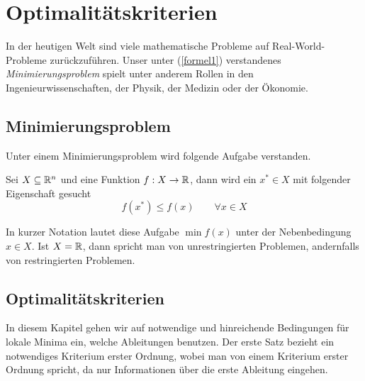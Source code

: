 \chapter{Optimalitätskriterien}


In der heutigen Welt sind viele mathematische Probleme auf Real-World-Probleme zurückzuführen. Unser unter (\ref{formel1}) verstandenes \textit{Minimierungsproblem} spielt unter anderem Rollen in den Ingenieurwissenschaften, der Physik, der Medizin oder der Ökonomie. 

\section{Minimierungsproblem}
Unter einem Minimierungsproblem wird folgende Aufgabe verstanden.  

\begin{definition}
	Sei $ X \subseteq \mathbb{R}^n $ und eine Funktion $ f: X \to \mathbb{R} $, dann wird ein $x^\ast \in X $ mit folgender Eigenschaft gesucht
	\begin{equation} 
		f(x^\ast) \leq f(x)   \qquad \forall x \in X 
		\label{formel1}
	\end{equation}
\end{definition}

\begin{bemerkung}
	In kurzer Notation lautet diese Aufgabe $ \min f(x)$ unter der Nebenbedingung $x \in X$. Ist $X = \mathbb{R}$, dann spricht man von unrestringierten Problemen, andernfalls von restringierten Problemen. 
\end{bemerkung}

\section{Optimalitätskriterien}

In diesem Kapitel gehen wir auf notwendige und hinreichende Bedingungen für lokale Minima ein, welche Ableitungen benutzen. Der erste Satz bezieht ein notwendiges Kriterium erster Ordnung, wobei man von einem Kriterium erster Ordnung spricht, da nur Informationen über die erste Ableitung eingehen.

